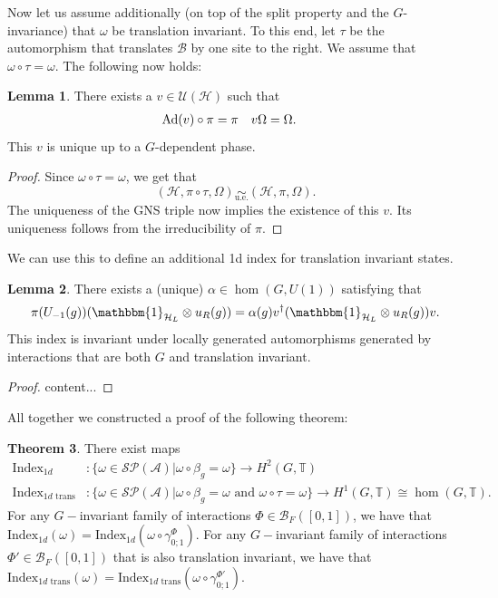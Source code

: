 \documentclass[12pt,a4paper,twoside]{article}
\let\originalleft\left
\let\originalright\right
\renewcommand{\left}{\mathopen{}\mathclose\bgroup\originalleft}
\renewcommand{\right}{\aftergroup\egroup\originalright}
\newcommand{\UU}{\mathcal U}
\newcommand{\BB}{\mathcal B}
\newcommand{\PP}{\mathcal P}
\newcommand{\HH}{\mathcal H}
\newcommand{\TT}{\mathbb T}
\renewcommand{\AA}{\mathcal A}
\newcommand{\id}{\mathbbm{1}}
\newcommand{\Ad}[1]{\textrm{Ad}\left(#1\right)}
\newcommand{\ue}{\underset{\text{u.e.}}{\sim}}
\theoremstyle{definition}
\newtheorem{theorem}{Theorem}[section]
\newtheorem{lemma}[theorem]{Lemma}
\numberwithin{equation}{section}
\begin{document}
Now let us assume additionally (on top of the split property and the $G$-invariance) that $\omega$ be translation invariant. To this end, let $\tau$ be the automorphism that translates $\BB$ by one site to the right. We assume that $\omega\circ\tau=\omega$. The following now holds:
\begin{lemma}
	There exists a $v\in\UU(\HH)$ such that
	\begin{align}
		\Ad{v}\circ\pi&=\pi&v\Omega&=\Omega.
	\end{align}
	This $v$ is unique up to a $G$-dependent phase.
\end{lemma}
\begin{proof}
	Since $\omega\circ\tau=\omega$, we get that
	\begin{equation}
		(\HH,\pi\circ\tau,\Omega)\ue (\HH,\pi,\Omega).
	\end{equation}
	The uniqueness of the GNS triple now implies the existence of this $v$. Its uniqueness follows from the irreducibility of $\pi$.
\end{proof}
We can use this to define an additional 1d index for translation invariant states.
\begin{lemma}
	There exists a (unique) $\alpha\in\hom(G,U(1))$ satisfying that
	\begin{equation}
		\pi(U_{-1}(g)) (\id_{\HH_L}\otimes u_R(g))=\alpha(g)v^\dagger(\id_{\HH_L}\otimes u_R(g)) v.
	\end{equation}
	This index is invariant under locally generated automorphisms generated by interactions that are both $G$ and translation invariant.
\end{lemma}
\begin{proof}
	content...
\end{proof}
All together we constructed a proof of the following theorem:
\begin{theorem}
	There exist maps
	\begin{align}
		\textrm{Index}_{1d}&:\{\omega\in\mathcal{S}\PP(\AA)|\omega\circ\beta_g=\omega\}\rightarrow H^2(G,\TT)\\
		\textrm{Index}_{1d\text{ trans}}&:\{\omega\in\mathcal{S}\PP(\AA)|\omega\circ\beta_g=\omega\text{ and }\omega\circ\tau=\omega\}\rightarrow H^1(G,\TT)\cong \hom(G,\TT).
	\end{align}
	For any $G-$invariant family of interactions $\Phi\in\BB_{F}([0,1])$, we have that $\textrm{Index}_{1d}(\omega)=\textrm{Index}_{1d}(\omega\circ\gamma^\Phi_{0;1})$. For any $G-$invariant family of interactions $\Phi'\in\BB_{F}([0,1])$ that is also translation invariant, we have that $\textrm{Index}_{1d\text{ trans}}(\omega)=\textrm{Index}_{1d\text{ trans}}(\omega\circ\gamma^{\Phi'}_{0;1})$.
\end{theorem}
\end{document}
